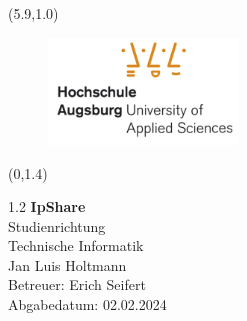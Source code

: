 
\textblockorigin{15mm}{30mm}

\thispagestyle{empty}\null
\begin{textblock}{10}(5.9,1.0)
\begin{figure}[h]
	\centering
		\includegraphics[width=0.45\textwidth]{hsa_informatik_logo_lq}
\end{figure}

\end{textblock}


\begin{textblock}{15}(0,1.4)
	\begin{flushleft}
		\begin{spacing} {1.2}
			\huge	
				\textbf{IpShare\\
				}
				\vspace{30pt}
			\LARGE
				Studienrichtung\\
				Technische Informatik\\
				\vspace{200pt}
				Jan Luis Holtmann\\
			\LARGE
				\vspace{150pt}
				Betreuer: Erich Seifert\\
				\vspace{10pt}		
				Abgabedatum: 02.02.2024\\
			\end{spacing}
		\end{flushleft}
		
\end{textblock}




